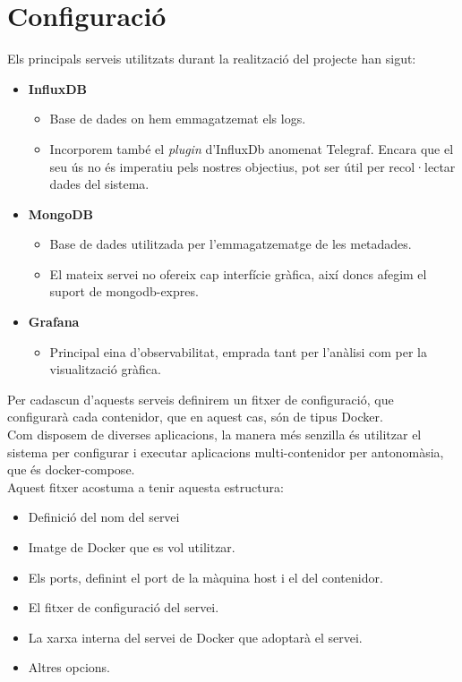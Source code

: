 \clearpage

\section*{Configuració}\label{sec:server-configuration}

Els principals serveis utilitzats durant la realització del projecte han sigut:

\begin{itemize}
    \item \textbf{InfluxDB}
    \begin{itemize}
        \item Base de dades on hem emmagatzemat els logs.
        \item {
            Incorporem també el \textit{plugin} d’InfluxDb anomenat Telegraf.
            Encara que el seu ús no és imperatiu pels nostres objectius, pot ser útil per recol·lectar dades del sistema.
        }
    \end{itemize}
    \item \textbf{MongoDB}
    \begin{itemize}
        \item Base de dades utilitzada per l’emmagatzematge de les metadades.
        \item El mateix servei no ofereix cap interfície gràfica, així doncs afegim el suport de mongodb-expres.
    \end{itemize}
    \item \textbf{Grafana}
    \begin{itemize}
        \item Principal eina d’observabilitat, emprada tant per l’anàlisi com per la visualització gràfica.
    \end{itemize}
\end{itemize}

\noindent
Per cadascun d’aquests serveis definirem un fitxer de configuració, que configurarà cada contenidor, que en aquest cas, són de tipus Docker. \\

\noindent
Com disposem de diverses aplicacions, la manera més senzilla és utilitzar el sistema per configurar i executar aplicacions multi-contenidor per antonomàsia, que és docker-compose. \\

\noindent
Aquest fitxer acostuma a tenir aquesta estructura:

\begin{itemize}
    \item Definició del nom del servei
    \item Imatge de Docker que es vol utilitzar.
    \item Els ports, definint el port de la màquina host i el del contenidor.
    \item El fitxer de configuració del servei.
    \item La xarxa interna del servei de Docker que adoptarà el servei.
    \item Altres opcions.
\end{itemize}

